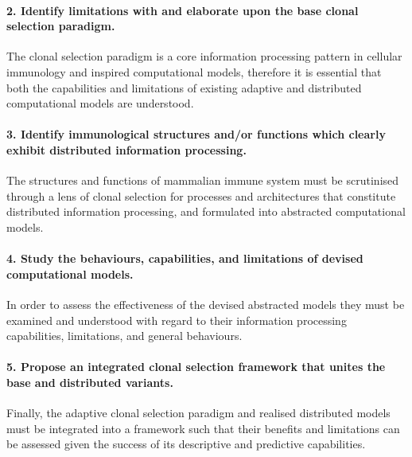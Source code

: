 %
%
\paragraph{2. Identify limitations with and elaborate upon the base clonal selection paradigm.}
The clonal selection paradigm is a core information processing pattern in cellular immunology and inspired computational models, therefore it is essential that both the capabilities and limitations of existing adaptive and distributed computational models are understood.

%
%
\paragraph{3. Identify immunological structures and/or functions which clearly exhibit distributed information processing.}
The structures and functions of mammalian immune system must be scrutinised through a lens of clonal selection for processes and architectures that constitute distributed information processing, and formulated into abstracted computational models.

%
%
\paragraph{4. Study the behaviours, capabilities, and limitations of devised computational models.}
In order to assess the effectiveness of the devised abstracted models they must be examined and understood with regard to their information processing capabilities, limitations, and general behaviours.

% 
%
\paragraph{5. Propose an integrated clonal selection framework that unites the base and distributed variants.}
Finally, the adaptive clonal selection paradigm and realised distributed models must be integrated into a framework such that their benefits and limitations can be assessed given the success of its descriptive and predictive capabilities.


%

